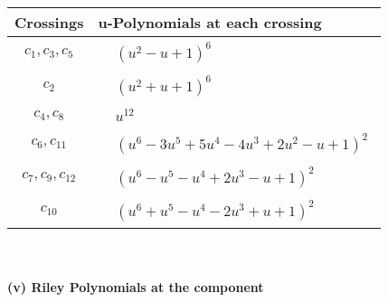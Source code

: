 \documentclass[1p]{elsarticle_modified}
\theoremstyle{definition}
\begin{document}
\begin{tabular}{m{50pt}|m{274pt}}
Crossings & \hspace{64pt}u-Polynomials at each crossing \\
\hline $$\begin{aligned}c_{1},c_{3},c_{5}\end{aligned}$$&$\begin{aligned}
&(u^2- u+1)^6
\end{aligned}$\\
\hline $$\begin{aligned}c_{2}\end{aligned}$$&$\begin{aligned}
&(u^2+u+1)^6
\end{aligned}$\\
\hline $$\begin{aligned}c_{4},c_{8}\end{aligned}$$&$\begin{aligned}
&u^{12}
\end{aligned}$\\
\hline $$\begin{aligned}c_{6},c_{11}\end{aligned}$$&$\begin{aligned}
&(u^6-3 u^5+5 u^4-4 u^3+2 u^2- u+1)^2
\end{aligned}$\\
\hline $$\begin{aligned}c_{7},c_{9},c_{12}\end{aligned}$$&$\begin{aligned}
&(u^6- u^5- u^4+2 u^3- u+1)^2
\end{aligned}$\\
\hline $$\begin{aligned}c_{10}\end{aligned}$$&$\begin{aligned}
&(u^6+u^5- u^4-2 u^3+u+1)^2
\end{aligned}$\\
\hline
\end{tabular}\\~\\
\newpage\renewcommand{\arraystretch}{1}
\flushleft \textbf{(v) Riley Polynomials at the component}\newline \\
\end{document}
